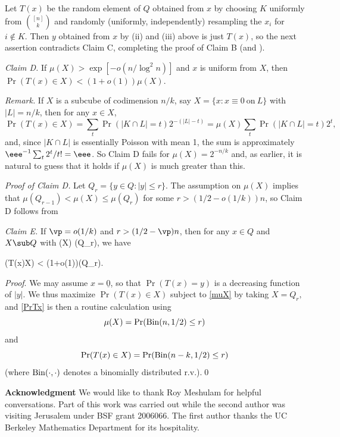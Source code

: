 Let $T(x)$ be
the random element of $Q$ %
obtained %
from $x$
by choosing $K$ uniformly from $\binom{[n]}{k}$ and
randomly (uniformly, independently) 
resampling %
the %
$x_i$  %
%
%
%
for $i\not\in K$.    %
Then $y$ %
obtained  %
from $x$ by (ii) and (iii) above is just $T(x)$,
so
the next assertion contradicts Claim C, completing the proof of
Claim B (and ).



\mn
\emph{Claim D.}
If $\mu(X) > \exp[-o(n/\log^2n)]$
and $x$ is uniform from $X$, then $\Pr(T(x)\in X) < (1+o(1))\mu(X)$.

\mn
\emph{Remark.}
If $X$ is a subcube of codimension $n/k$, say
$X=\{x:x \equiv 0 ~\mbox{on}~L\}$ with $|L |=n/k$,
then for any $x\in X$,
$$
\Pr(T(x)\in X) =\sum_t\Pr(|K\cap L |=t)2^{-(|L|-t)}
=\mu(X)\sum_t\Pr(|K\cap L |=t)2^t,
$$
and, since $|K\cap L|$ is essentially Poisson with mean 1,
the sum is
approximately
$ \eee^{-1}\sum_t2^t/t! = \eee$.
So Claim D fails for $\mu(X) = 2^{-n/k}$ and, as earlier,
it is %
natural to guess that it holds if $\mu(X)$ is much
%
greater  %
than this.

\mn
\emph{Proof of Claim D.}
Let $Q_r=\{y\in Q:|y|\leq r\}$.
The assumption on $\mu(X)$ implies that
$\mu(Q_{r-1})<\mu(X) \leq \mu(Q_r)$
for some $r >(1/2-o(1/k))n$, so Claim D follows from

\mn
\emph{Claim E.}
If $\vp =o(1/k)$ and $r > (1/2-\vp)n$, then for any $x\in Q$ and
$X\sub Q$ with
\mu(X) \leq \mu(Q_r),
\enq
we have

\Pr(T(x)\in X) < (1+o(1))\mu(Q_r).
\enq

\mn
\emph{Proof}.
We may assume $x=\underline{0}$, so that $\Pr(T(x)=y)$ is a decreasing
function of $|y|$.
We thus maximize $\Pr(T(x)\in X)$
subject to \eqref{muX} by taking
$
X=Q_r,
$
and \eqref{PrTx} is then a routine calculation
using
$$\mu(X) =\Pr({\rm Bin}(n,1/2)\leq r)$$
and
$$\Pr(T(x)\in X) =\Pr({\rm Bin}(n-k,1/2)\leq r)$$
(where ${\rm Bin}(\cdot,\cdot)$ denotes a binomially
distributed r.v.).\qed


\mn
{\bf Acknowledgment}
We would like to thank Roy Meshulam for helpful conversations.
Part of this work was carried out while the second author
was visiting Jerusalem
under BSF grant 2006066.
The first author
%
%
thanks the UC Berkeley %
Mathematics Department  %
for its hospitality.

%

